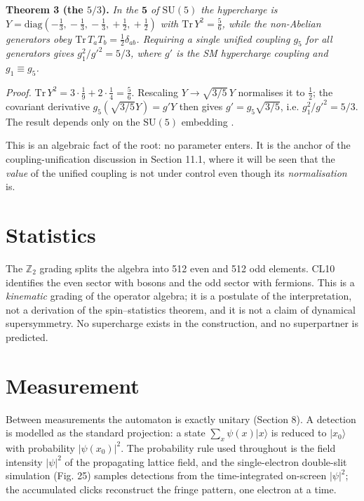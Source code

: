 \documentclass[aps,prd,amsmath,amssymb,superscriptaddress,longbibliography,floatfix,preprint]{revtex4-2}
\begin{document}
\textbf{Theorem 3 (the $5/3$).} \emph{In the $\mathbf 5$ of $\mathrm{SU}(5)$ the hypercharge is $Y = \mathrm{diag}(-\tfrac13,\allowbreak{}-\tfrac13,\allowbreak{}-\tfrac13,\allowbreak{}+\tfrac12,\allowbreak{}+\tfrac12)$ with $\mathrm{Tr}\,\allowbreak{}Y^2 = \tfrac56$, while the non-Abelian generators obey $\mathrm{Tr}\,\allowbreak{}T_aT_b = \tfrac12\delta_{ab}$. Requiring a single unified coupling $g_5$ for all generators gives $g_1^2/g'^2 = 5/3$, where $g'$ is the SM hypercharge coupling and $g_1 \equiv g_5$.}

\emph{Proof.} $\mathrm{Tr}\,\allowbreak{}Y^2 = 3\cdot\tfrac19 + 2\cdot\tfrac14 = \tfrac56$. Rescaling $Y \to \sqrt{3/5}\,\allowbreak{}Y$ normalises it to $\tfrac12$; the covariant derivative $g_5 (\sqrt{3/5}Y) = g' Y$ then gives $g' = g_5\sqrt{3/5}$, i.e. $g_1^2/g'^2 = 5/3$. The result depends only on the $\mathrm{SU}(5)$ embedding \cite{ref06,ref09}.

This is an algebraic fact of the root: no parameter enters. It is the anchor of the coupling-unification discussion in Section 11.1, where it will be seen that the \emph{value} of the unified coupling is not under control even though its \emph{normalisation} is.

\section{Statistics}

The $\mathbb{Z}_2$ grading splits the algebra into 512 even and 512 odd elements. CL10 identifies the even sector with bosons and the odd sector with fermions. This is a \emph{kinematic} grading of the operator algebra; it is a postulate of the interpretation, not a derivation of the spin--statistics theorem, and it is not a claim of dynamical supersymmetry. No supercharge exists in the construction, and no superpartner is predicted.

\section{Measurement}

Between measurements the automaton is exactly unitary (Section 8). A detection is modelled as the standard projection: a state $\sum_x \psi(x)|x\rangle$ is reduced to $|x_0\rangle$ with probability $|\psi(x_0)|^2$. The probability rule used throughout is the field intensity $|\psi|^2$ of the propagating lattice field, and the single-electron double-slit simulation (Fig. 25) \cite{ref47} samples detections from the time-integrated on-screen $|\psi|^2$; the accumulated clicks reconstruct the fringe pattern, one electron at a time.
\end{document}
